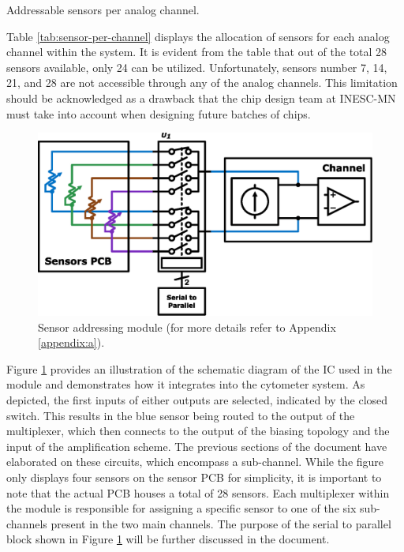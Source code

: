\begin{table}[ht]
    \centering
    \caption{Addressable sensors per analog channel.}
    \begin{small}
    
    \end{small}
    \label{tab:sensor-per-channel}
\end{table}

Table \ref{tab:sensor-per-channel} displays the allocation of sensors for each analog channel within the system. It is evident from the table that out of the total 28 sensors available, only 24 can be utilized. Unfortunately, sensors number 7, 14, 21, and 28 are not accessible through any of the analog channels. This limitation should be acknowledged as a drawback that the chip design team at \ac{INESC-MN} must take into account when designing future batches of chips.

\begin{figure}[!ht]
    \centering
    \includegraphics[width=.7\textwidth]{images/chapter_4/sensor_addressing/sensormux.eps}
    \caption{Sensor addressing module (for more details refer to Appendix \ref{appendix:a}).}
    \label{figure:sensormux}
\end{figure}

Figure \ref{figure:sensormux} provides an illustration of the schematic diagram of the \ac{IC} used in the module and demonstrates how it integrates into the cytometer system. As depicted, the first inputs of either outputs are selected, indicated by the closed switch. This results in the blue sensor being routed to the output of the multiplexer, which then connects to the output of the biasing topology and the input of the amplification scheme. The previous sections of the document have elaborated on these circuits, which encompass a sub-channel. While the figure only displays four sensors on the sensor \ac{PCB} for simplicity, it is important to note that the actual \ac{PCB} houses a total of 28 sensors. Each multiplexer within the module is responsible for assigning a specific sensor to one of the six sub-channels present in the two main channels. The purpose of the serial to parallel block shown in Figure \ref{figure:sensormux} will be further discussed in the document.

